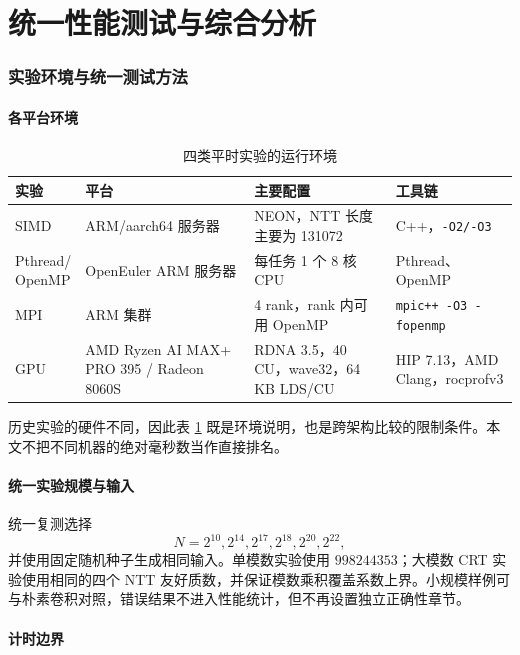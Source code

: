 \part{统一性能测试与综合分析}

\section{实验环境与统一测试方法}

\subsection{各平台环境}

\begin{table}[H]
  \centering
  \caption{四类平时实验的运行环境}
  \label{tab:all-env}
  \small
  \begin{tabularx}{\textwidth}{p{2.4cm} p{3.1cm} X p{3.0cm}}
    \toprule
    实验 & 平台 & 主要配置 & 工具链 \\
    \midrule
    SIMD & ARM/aarch64 服务器 & NEON，NTT 长度主要为 131072 & C++，\texttt{-O2/-O3} \\
    \shortstack{Pthread/\\OpenMP} & OpenEuler ARM 服务器 & 每任务 1 个 8 核 CPU & Pthread、OpenMP \\
    MPI & ARM 集群 & 4 rank，rank 内可用 OpenMP & \texttt{mpic++ -O3 -fopenmp} \\
    GPU & AMD Ryzen AI MAX+ PRO 395 / Radeon 8060S & RDNA 3.5，40 CU，wave32，64 KB LDS/CU & HIP 7.13，AMD Clang，rocprofv3 \\
    \bottomrule
  \end{tabularx}
\end{table}

历史实验的硬件不同，因此表 \ref{tab:all-env} 既是环境说明，也是跨架构比较的限制条件。本文不把不同机器的绝对毫秒数当作直接排名。

\subsection{统一实验规模与输入}

统一复测选择
\[
N=2^{10},2^{14},2^{17},2^{18},2^{20},2^{22},
\]
并使用固定随机种子生成相同输入。单模数实验使用 $998244353$；大模数 CRT 实验使用相同的四个 NTT 友好质数，并保证模数乘积覆盖系数上界。小规模样例可与朴素卷积对照，错误结果不进入性能统计，但不再设置独立正确性章节。

\subsection{计时边界}

